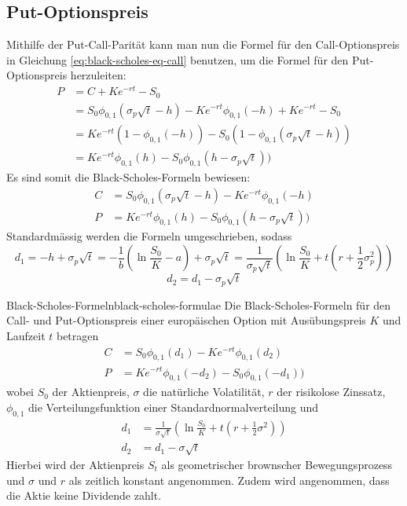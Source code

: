 \documentclass[11pt]{report} %
\begin{document}
\subsection{Put-Optionspreis}
Mithilfe der Put-Call-Parität kann man nun die Formel für den Call-Optionspreis in Gleichung \ref{eq:black-scholes-eq-call} benutzen, um die Formel für den Put-Optionspreis herzuleiten:
\begin{align*}
    P&=C+Ke^{-rt}-S_0\\
    &=S_0\phi_{0, 1}(\sigma_p\sqrt{t}-h)-Ke^{-rt}\phi_{0, 1}(-h)+Ke^{-rt}-S_0\\
    &=Ke^{-rt}(1-\phi_{0, 1}(-h))-S_0(1-\phi_{0, 1}(\sigma_p\sqrt{t}-h))\\
    &=Ke^{-rt}\phi_{0, 1}(h)-S_0\phi_{0, 1}(h-\sigma_p\sqrt{t}))
\end{align*}
Es sind somit die Black-Scholes-Formeln bewiesen:
\begin{align*}
    C&=S_0\phi_{0, 1}(\sigma_p\sqrt{t}-h)-Ke^{-rt}\phi_{0, 1}(-h)\\
    P&=Ke^{-rt}\phi_{0, 1}(h)-S_0\phi_{0, 1}(h-\sigma_p\sqrt{t}))
\end{align*}
Standardmässig werden die Formeln umgeschrieben, sodass
$$d_1=-h+\sigma_p\sqrt{t}=-\frac{1}{b}\left(\ln{\frac{S_0}{K}}-a\right)+\sigma_p\sqrt{t}=\frac{1}{\sigma_p\sqrt{t}}\left(\ln{\frac{S_0}{K}}+t\left(r+\frac{1}{2}\sigma_p^2\right)\right)$$
$$d_2=d_1-\sigma_p\sqrt{t}$$
\begin{Theorem}{Black-Scholes-Formeln}{black-scholes-formulae}
    Die Black-Scholes-Formeln für den Call- und Put-Optionspreis einer europäischen Option mit Ausübungspreis $K$ und Laufzeit $t$ betragen
    \begin{align*}
        C&=S_0\phi_{0, 1}(d_1)-Ke^{-rt}\phi_{0, 1}(d_2)\\
        P&=Ke^{-rt}\phi_{0, 1}(-d_2)-S_0\phi_{0, 1}(-d_1))
    \end{align*}
    wobei $S_0$ der Aktienpreis, $\sigma$ die natürliche Volatilität, $r$ der risikolose Zinssatz, $\phi_{0, 1}$ die Verteilungsfunktion einer Standardnormalverteilung und
    \begin{align*}
        d_1&=\frac{1}{\sigma\sqrt{t}}\left(\ln{\frac{S_0}{K}}+t\left(r+\frac{1}{2}\sigma^2\right)\right)\\
        d_2&=d_1-\sigma\sqrt{t}
    \end{align*}
    Hierbei wird der Aktienpreis $S_t$ als geometrischer brownscher Bewegungsprozess und $\sigma$ und $r$ als zeitlich konstant angenommen. Zudem wird angenommen, dass die Aktie keine Dividende zahlt.
\end{Theorem}
\end{document}
